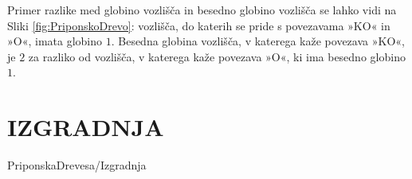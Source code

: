 Primer razlike med globino vozlišča in besedno globino vozlišča se lahko vidi na Sliki \ref{fig:PriponskoDrevo}: vozlišča, do katerih se pride s povezavama »KO« in »O«, imata globino $1$. Besedna globina vozlišča, v katerega kaže povezava »KO«, je $2$ za razliko od vozlišča, v katerega kaže povezava »O«, ki ima besedno globino $1$. 

\section{IZGRADNJA}\label{sec:izgradnja}
{PriponskaDrevesa/Izgradnja}